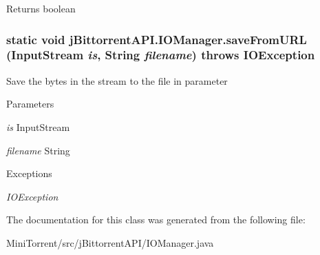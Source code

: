 \begin{DoxyReturn}{Returns}
boolean 
\end{DoxyReturn}
\hypertarget{classj_bittorrent_a_p_i_1_1_i_o_manager_a5169f9bdb6f434a7bb3f83586b943a61}{
\subsubsection[{saveFromURL}]{\setlength{\rightskip}{0pt plus 5cm}static void jBittorrentAPI.IOManager.saveFromURL (InputStream {\em is}, \/  String {\em filename})  throws IOException }}
\label{classj_bittorrent_a_p_i_1_1_i_o_manager_a5169f9bdb6f434a7bb3f83586b943a61}
Save the bytes in the stream to the file in parameter 
\begin{DoxyParams}{Parameters}
\item[{\em is}]InputStream \item[{\em filename}]String \end{DoxyParams}

\begin{DoxyExceptions}{Exceptions}
\item[{\em IOException}]\end{DoxyExceptions}


The documentation for this class was generated from the following file:\begin{DoxyCompactItemize}
\item 
MiniTorrent/src/jBittorrentAPI/IOManager.java\end{DoxyCompactItemize}
